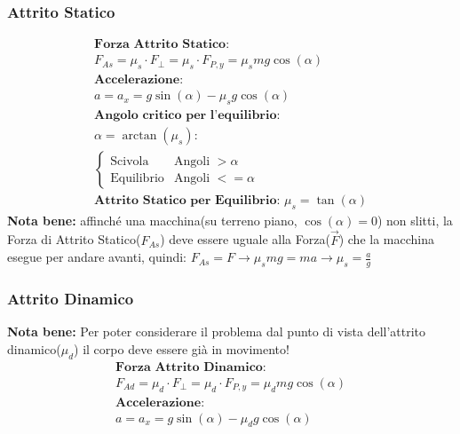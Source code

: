 \subsubsection{Attrito Statico}
\begin{gather*}
    \textbf{Forza Attrito Statico: } \\ F_{As} = \mu_s \cdot F_\perp = \mu_s \cdot F_{P, y} = \mu_s m g \cos (\alpha) \\
    \textbf{Accelerazione: } \\ a = a_x = g \sin (\alpha) - \mu_s g \cos (\alpha) \\
    \textbf{Angolo critico per l'equilibrio: } \\ \alpha = \arctan (\mu_s) : \\
    \begin{cases}
        \text{Scivola} & \text{Angoli } > \alpha \\
        \text{Equilibrio} & \text{Angoli } <= \alpha
    \end{cases}    \\
    \textbf{Attrito Statico per Equilibrio: } \mu_s = \tan (\alpha)
\end{gather*}
\textbf{Nota bene: } affinché una macchina(su terreno piano, $\cos (\alpha) = 0$) non slitti, la Forza di Attrito Statico($F_{As}$) deve essere uguale alla Forza($\vec{F}$) che la macchina esegue per andare avanti, quindi: $F_{As} = F \rightarrow \mu_s m g = m a \rightarrow \mu_s = \frac{a}{g}$
\subsubsection{Attrito Dinamico}
\textbf{Nota bene: } Per poter considerare il problema dal punto di vista dell'attrito dinamico($\mu_d$) il corpo deve essere già in movimento!
\begin{gather*}
    \textbf{Forza Attrito Dinamico:} \\ F_{Ad} = \mu_d \cdot F_\perp = \mu_d \cdot F_{P, y} = \mu_d m g \cos (\alpha) \\
    \textbf{Accelerazione: } \\ a = a_x = g \sin (\alpha) - \mu_d g \cos (\alpha)
\end{gather*}




